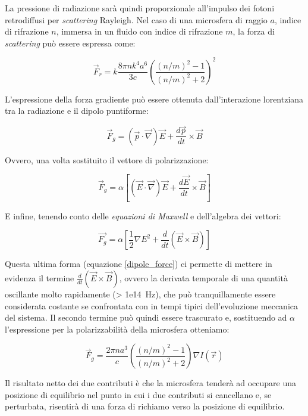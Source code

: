 La pressione di radiazione sarà quindi proporzionale all'impulso
dei fotoni retrodiffusi per \textit{scattering} Rayleigh.
Nel caso di una microsfera di raggio $a$, indice di rifrazione $n$,
immersa in un fluido con indice di rifrazione $m$, la forza di
\textit{scattering} può essere espressa\cite{HARADA1996529} come:

\begin{equation}
\vec{F}_r = \hat{k} \frac{8 \pi n k^4 a^6}{3c}
\left(
\frac{(n/m)^2 - 1}{(n/m)^2 + 2}
\right)^2
\end{equation}

L'espressione della forza gradiente può essere ottenuta
dall'interazione lorentziana tra la radiazione e il dipolo puntiforme:

$$ \vec{F}_g =
    \left(
        \vec{p} \cdot \vec{\nabla}
    \right)
    \vec{E}
    + \frac{d\vec{p}}{dt} \times \vec{B}
$$

Ovvero, una volta sostituito il vettore di polarizzazione:

$$ \vec{F}_g =
    \alpha
    \left[
        \left( \vec{E} \cdot \vec{\nabla} \right) \vec{E}
        + \frac{d\vec{E}}{dt} \times \vec{B}
    \right]
$$

E infine, tenendo conto delle \emph{equazioni di Maxwell} e
dell'algebra dei vettori:

\begin{equation}
\label{dipole_force}
\vec{F_g} =
    \alpha 
    \left[
        \frac{1}{2}\nabla E^2
        + \frac{d}{dt}\left(\vec{E} \times \vec{B}\right)
    \right]
\end{equation}

Questa ultima forma (equazione \ref{dipole_force}) ci permette di
mettere in evidenza il termine $\frac{d}{dt}(\vec{E} \times \vec{B})$,
ovvero la derivata temporale di una quantità oscillante molto
rapidamente (\SI{> 1e14}{\Hz}), che
può tranquillamente essere considerata costante se confrontata con in
tempi tipici dell'evoluzione meccanica del sistema.
Il secondo termine può quindi essere trascurato e, sostituendo ad
$\alpha$ l'espressione per la polarizzabilità della microsfera
otteniamo:

\begin{equation}
\vec{F}_g = 
    \frac{2\pi n a^3}{c}
    \left(
        \frac{(n/m)^2 - 1}{(n/m)^2 + 2}
    \right)
    \nabla I(\vec{r})
\end{equation}

Il risultato netto dei due contributi è che la microsfera tenderà ad
occupare una posizione di equilibrio nel punto in cui i due contributi
si cancellano e, se perturbata, risentirà di una forza di richiamo
verso la posizione di equilibrio.

